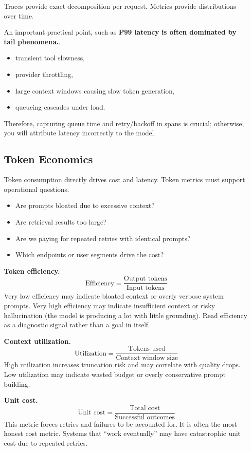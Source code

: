 Traces provide exact decomposition per request. Metrics provide distributions over time.

An important practical point, such as \textbf{P99 latency is often dominated by tail phenomena.}.
\begin{itemize}
\item transient tool slowness,
\item provider throttling,
\item large context windows causing slow token generation,
\item queueing cascades under load.
\end{itemize}
Therefore, capturing queue time and retry/backoff in spans is crucial; otherwise, you will attribute latency incorrectly to the model.

\subsection{Token Economics}

Token consumption directly drives cost and latency. Token metrics must support operational questions.
\begin{itemize}
\item Are prompts bloated due to excessive context?
\item Are retrieval results too large?
\item Are we paying for repeated retries with identical prompts?
\item Which endpoints or user segments drive the cost?
\end{itemize}

\textbf{Token efficiency.}
\[
\text{Efficiency} = \frac{\text{Output tokens}}{\text{Input tokens}}
\]
Very low efficiency may indicate bloated context or overly verbose system prompts. Very high efficiency may indicate insufficient context or risky hallucination (the model is producing a lot with little grounding). Read efficiency as a diagnostic signal rather than a goal in itself.

\textbf{Context utilization.}
\[
\text{Utilization} = \frac{\text{Tokens used}}{\text{Context window size}}
\]
High utilization increases truncation risk and may correlate with quality drops. Low utilization may indicate wasted budget or overly conservative prompt building.

\textbf{Unit cost.}
\[
\text{Unit cost} = \frac{\text{Total cost}}{\text{Successful outcomes}}
\]
This metric forces retries and failures to be accounted for. It is often the most honest cost metric. Systems that ``work eventually'' may have catastrophic unit cost due to repeated retries.

